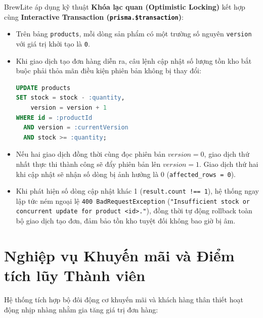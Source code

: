 \documentclass[12pt,a4paper,oneside]{report}
\begin{document}
BrewLite áp dụng kỹ thuật \textbf{Khóa lạc quan (Optimistic Locking)} kết hợp cùng \textbf{Interactive Transaction (\texttt{prisma.\$transaction})}:
\begin{itemize}
    \item Trên bảng \texttt{products}, mỗi dòng sản phẩm có một trường số nguyên \texttt{version} với giá trị khởi tạo là \texttt{0}.
    \item Khi giao dịch tạo đơn hàng diễn ra, câu lệnh cập nhật số lượng tồn kho bắt buộc phải thỏa mãn điều kiện phiên bản không bị thay đổi:
    \begin{lstlisting}[language=SQL]
UPDATE products
SET stock = stock - :quantity,
    version = version + 1
WHERE id = :productId 
  AND version = :currentVersion 
  AND stock >= :quantity;
    \end{lstlisting}
    \item Nếu hai giao dịch đồng thời cùng đọc phiên bản \(version = 0\), giao dịch thứ nhất thực thi thành công sẽ đẩy phiên bản lên \(version = 1\). Giao dịch thứ hai khi cập nhật sẽ nhận số dòng bị ảnh hưởng là 0 (\texttt{affected\_rows = 0}).
    \item Khi phát hiện số dòng cập nhật khác 1 (\texttt{result.count !== 1}), hệ thống ngay lập tức ném ngoại lệ \texttt{400 BadRequestException} (\texttt{"Insufficient stock or concurrent update for product <id>."}), đồng thời tự động rollback toàn bộ giao dịch tạo đơn, đảm bảo tồn kho tuyệt đối không bao giờ bị âm.
\end{itemize}

\section{Nghiệp vụ Khuyến mãi và Điểm tích lũy Thành viên}
Hệ thống tích hợp bộ đôi động cơ khuyến mãi và khách hàng thân thiết hoạt động nhịp nhàng nhằm gia tăng giá trị đơn hàng:
\end{document}

